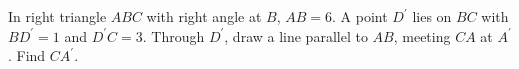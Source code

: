 In right triangle $ABC$ with right angle at $B$, $AB=6$. A point $D^{\prime}$ lies on $BC$ with $BD^{\prime}=1$ and $D^{\prime} C=3$. Through $D^{\prime}$, draw a line parallel to $AB$, meeting $CA$ at $A^{\prime}$. Find $CA^{\prime}$.

